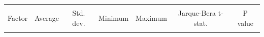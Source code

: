 \documentclass[12pt,bibliography=totoc]{article}
\begin{document}
\begin{table}[H]

\fontsize{10}{10}\selectfont
\centering %
\begin{tabular}{l c c c c c c}%
\hline\hline   \\ [-1.5ex]               %
Factor & Average & Std. dev. & Minimum & Maximum & Jarque-Bera t-stat.  & P value \\ [0.5ex] %

\hline       \\ [-1.5ex]           %



\end{tabular}
\end{table}
\end{document}

